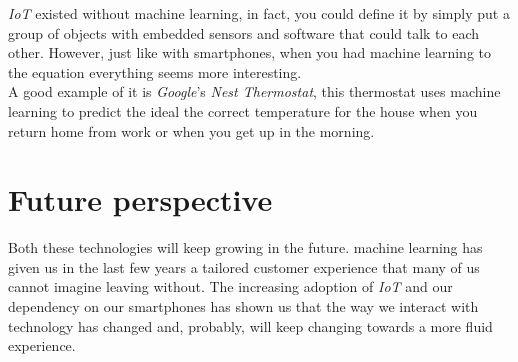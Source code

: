 \documentclass{llncs}
\begin{document}
\emph{IoT} existed without machine learning, in fact, you could define it by simply put a group of objects with embedded sensors and software that could talk to each other. However, just like with smartphones, when you had machine learning to the equation everything seems more interesting.\\

A good example of it is \emph{Google}'s \emph{Nest Thermostat}, this thermostat uses machine learning to predict the ideal the correct temperature for the house when you return home from work or when you get up in the morning.
\section{Future perspective}
Both these technologies will keep growing in the future. machine learning has given us in the last few years a tailored customer experience that many of us cannot imagine leaving without. The increasing adoption of \emph{IoT} and our dependency on our smartphones has shown us that the way we interact with technology has changed and, probably, will keep changing towards a more fluid experience.

\printbibliography
\end{document}

